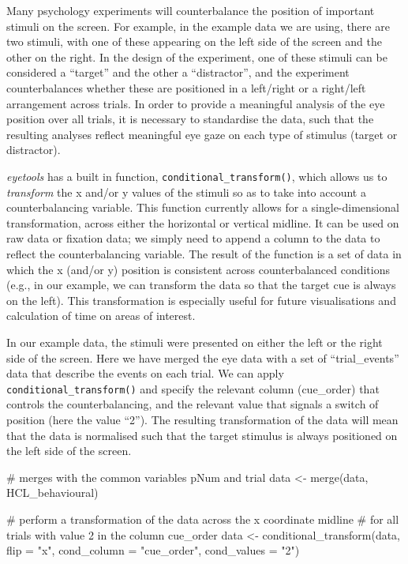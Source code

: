 \documentclass[
  man,
  floatsintext,
  longtable,
  nolmodern,
  notxfonts,
  notimes,
  colorlinks=true,linkcolor=blue,citecolor=blue,urlcolor=blue]{apa7}
\newenvironment{Shaded}{\begin{snugshade}}{\end{snugshade}}
\newcommand{\AttributeTok}[1]{\textcolor[rgb]{0.40,0.45,0.13}{#1}}
\newcommand{\CommentTok}[1]{\textcolor[rgb]{0.37,0.37,0.37}{#1}}
\newcommand{\FunctionTok}[1]{\textcolor[rgb]{0.28,0.35,0.67}{#1}}
\newcommand{\NormalTok}[1]{\textcolor[rgb]{0.00,0.23,0.31}{#1}}
\newcommand{\OtherTok}[1]{\textcolor[rgb]{0.00,0.23,0.31}{#1}}
\newcommand{\StringTok}[1]{\textcolor[rgb]{0.13,0.47,0.30}{#1}}
\begin{document}
Many psychology experiments will counterbalance the position of
important stimuli on the screen. For example, in the example data we are
using, there are two stimuli, with one of these appearing on the left
side of the screen and the other on the right. In the design of the
experiment, one of these stimuli can be considered a ``target'' and the
other a ``distractor'', and the experiment counterbalances whether these
are positioned in a left/right or a right/left arrangement across
trials. In order to provide a meaningful analysis of the eye position
over all trials, it is necessary to standardise the data, such that the
resulting analyses reflect meaningful eye gaze on each type of stimulus
(target or distractor).

\emph{eyetools} has a built in function,
\texttt{conditional\_transform()}, which allows us to \emph{transform}
the x and/or y values of the stimuli so as to take into account a
counterbalancing variable. This function currently allows for a
single-dimensional transformation, across either the horizontal or
vertical midline. It can be used on raw data or fixation data; we simply
need to append a column to the data to reflect the counterbalancing
variable. The result of the function is a set of data in which the x
(and/or y) position is consistent across counterbalanced conditions
(e.g., in our example, we can transform the data so that the target cue
is always on the left). This transformation is especially useful for
future visualisations and calculation of time on areas of interest.

In our example data, the stimuli were presented on either the left or
the right side of the screen. Here we have merged the eye data with a
set of ``trial\_events'' data that describe the events on each trial. We
can apply \texttt{conditional\_transform()} and specify the relevant
column (cue\_order) that controls the counterbalancing, and the relevant
value that signals a switch of position (here the value ``2''). The
resulting transformation of the data will mean that the data is
normalised such that the target stimulus is always positioned on the
left side of the screen.

\begin{Shaded}
\begin{Highlighting}[]
\CommentTok{\# merges with the common variables pNum and trial}
\NormalTok{data }\OtherTok{\textless{}{-}} \FunctionTok{merge}\NormalTok{(data, HCL\_behavioural) }

\CommentTok{\# perform a transformation of the data across the x coordinate midline}
\CommentTok{\# for all trials with value 2 in the column cue\_order}
\NormalTok{data }\OtherTok{\textless{}{-}} \FunctionTok{conditional\_transform}\NormalTok{(data, }
                              \AttributeTok{flip =} \StringTok{"x"}\NormalTok{, }
                              \AttributeTok{cond\_column =} \StringTok{"cue\_order"}\NormalTok{, }
                              \AttributeTok{cond\_values =} \StringTok{"2"}\NormalTok{) }
\end{Highlighting}
\end{Shaded}
\end{document}
